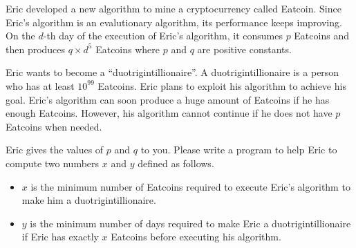 Eric developed a new algorithm to mine a cryptocurrency called 
Eatcoin. 
Since Eric's algorithm is an evalutionary algorithm,
its performance keeps improving. 
On the $d$-th day of the execution of Eric's algorithm, 
it consumes $p$ Eatcoins and then
produces $q\times d^5$ Eatcoins where $p$ and $q$
are positive constants.

Eric wants to become a ``duotrigintillionaire''. 
A duotrigintillionaire is a person who has at least $10^{99}$ Eatcoins. 
Eric plans to exploit his algorithm to achieve his goal.
Eric's algorithm can soon produce a huge amount of Eatcoins if
he has enough Eatcoins.
However, his algorithm cannot continue if he does not have
$p$ Eatcoins when needed.

Eric gives the values of $p$ and $q$ to you. Please write a program
to help Eric to compute two numbers $x$ and $y$ defined as follows.
\begin{itemize}
\item $x$ is the minimum number of Eatcoins required to execute Eric's 
algorithm to make him a duotrigintillionaire.
\item $y$ is the minimum number of days required to make Eric a 
duotrigintillionaire if Eric has exactly $x$ Eatcoins before executing his algorithm.
\end{itemize}
